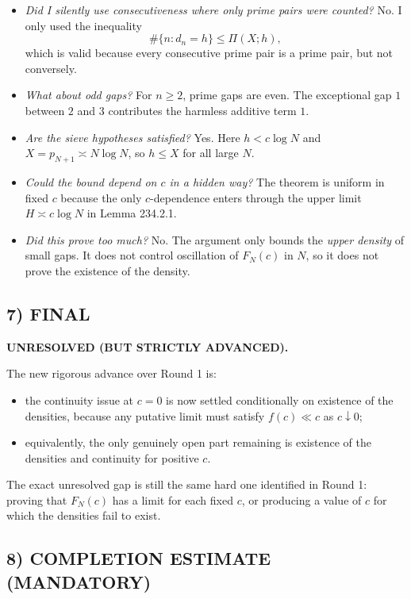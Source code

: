 \begin{itemize}
\item \emph{Did I silently use consecutiveness where only prime pairs were counted?} No. I only used the inequality
\[
\#\{n:d_n=h\}\le \Pi(X;h),
\]
which is valid because every consecutive prime pair is a prime pair, but not conversely.

\item \emph{What about odd gaps?} For $n\ge 2$, prime gaps are even. The exceptional gap $1$ between $2$ and $3$ contributes the harmless additive term $1$.

\item \emph{Are the sieve hypotheses satisfied?} Yes. Here $h<c\log N$ and $X=p_{N+1}\asymp N\log N$, so $h\le X$ for all large $N$.

\item \emph{Could the bound depend on $c$ in a hidden way?} The theorem is uniform in fixed $c$ because the only $c$-dependence enters through the upper limit $H\asymp c\log N$ in Lemma 234.2.1.

\item \emph{Did this prove too much?} No. The argument only bounds the \emph{upper density} of small gaps. It does not control oscillation of $F_N(c)$ in $N$, so it does not prove the existence of the density.
\end{itemize}

\subsection*{7) FINAL}

\textbf{UNRESOLVED (BUT STRICTLY ADVANCED).}

The new rigorous advance over Round 1 is:
\begin{itemize}
\item the continuity issue at $c=0$ is now settled conditionally on existence of the densities, because any putative limit must satisfy $f(c)\ll c$ as $c\downarrow 0$;
\item equivalently, the only genuinely open part remaining is existence of the densities and continuity for positive $c$.
\end{itemize}

The exact unresolved gap is still the same hard one identified in Round 1: proving that $F_N(c)$ has a limit for each fixed $c$, or producing a value of $c$ for which the densities fail to exist.

\subsection*{8) COMPLETION ESTIMATE (MANDATORY)}


